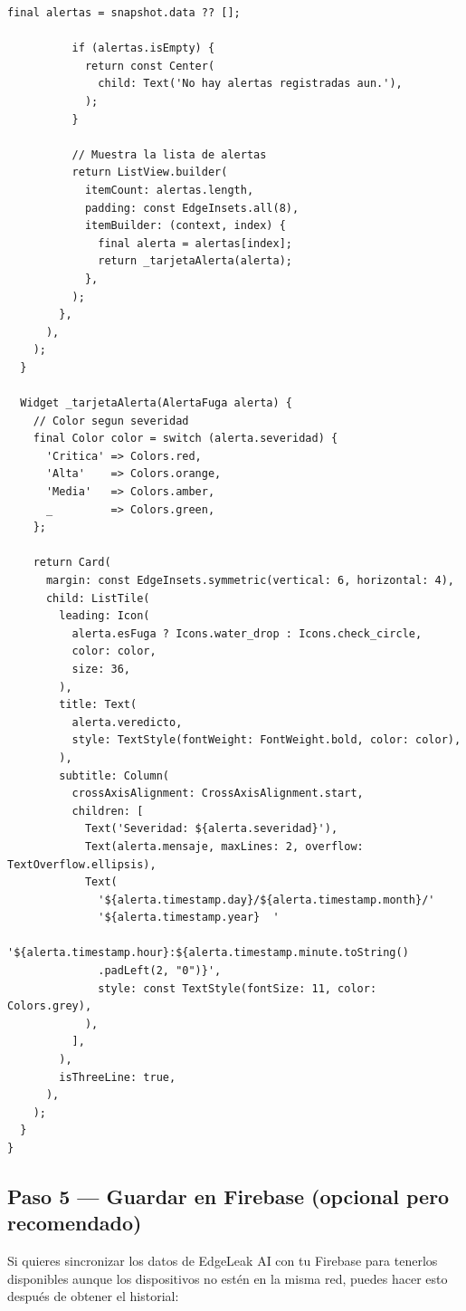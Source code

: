 \documentclass[12pt, a4paper]{article}
\begin{document}
\begin{lstlisting}[style=dartStyle, caption={lib/screens/historial\_edgeleak\_screen.dart}]
          final alertas = snapshot.data ?? [];

          if (alertas.isEmpty) {
            return const Center(
              child: Text('No hay alertas registradas aun.'),
            );
          }

          // Muestra la lista de alertas
          return ListView.builder(
            itemCount: alertas.length,
            padding: const EdgeInsets.all(8),
            itemBuilder: (context, index) {
              final alerta = alertas[index];
              return _tarjetaAlerta(alerta);
            },
          );
        },
      ),
    );
  }

  Widget _tarjetaAlerta(AlertaFuga alerta) {
    // Color segun severidad
    final Color color = switch (alerta.severidad) {
      'Critica' => Colors.red,
      'Alta'    => Colors.orange,
      'Media'   => Colors.amber,
      _         => Colors.green,
    };

    return Card(
      margin: const EdgeInsets.symmetric(vertical: 6, horizontal: 4),
      child: ListTile(
        leading: Icon(
          alerta.esFuga ? Icons.water_drop : Icons.check_circle,
          color: color,
          size: 36,
        ),
        title: Text(
          alerta.veredicto,
          style: TextStyle(fontWeight: FontWeight.bold, color: color),
        ),
        subtitle: Column(
          crossAxisAlignment: CrossAxisAlignment.start,
          children: [
            Text('Severidad: ${alerta.severidad}'),
            Text(alerta.mensaje, maxLines: 2, overflow: TextOverflow.ellipsis),
            Text(
              '${alerta.timestamp.day}/${alerta.timestamp.month}/'
              '${alerta.timestamp.year}  '
              '${alerta.timestamp.hour}:${alerta.timestamp.minute.toString()
              .padLeft(2, "0")}',
              style: const TextStyle(fontSize: 11, color: Colors.grey),
            ),
          ],
        ),
        isThreeLine: true,
      ),
    );
  }
}
\end{lstlisting}

\subsection{Paso 5 — Guardar en Firebase (opcional pero recomendado)}

Si quieres sincronizar los datos de EdgeLeak AI con tu Firebase para
tenerlos disponibles aunque los dispositivos no estén en la misma red,
puedes hacer esto después de obtener el historial:
\end{document}
